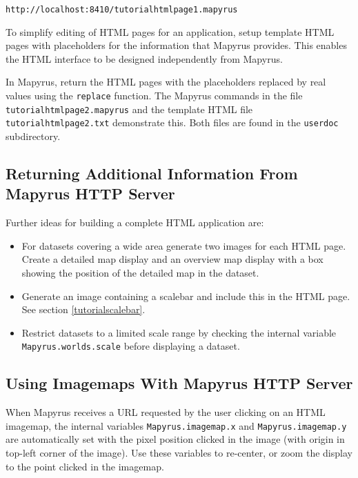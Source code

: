 \begin{verbatim}
http://localhost:8410/tutorialhtmlpage1.mapyrus
\end{verbatim}

To simplify editing of HTML pages for an application, setup
template HTML pages with placeholders for the information that
Mapyrus provides.  This enables the HTML interface to be designed
independently from Mapyrus.

In Mapyrus, return the HTML pages with the placeholders
replaced by real values using the
\texttt{replace}
function.  The Mapyrus commands in the file \texttt{tutorialhtmlpage2.mapyrus}
and the template HTML file \texttt{tutorialhtmlpage2.txt}
demonstrate this.  Both files are found in the
\texttt{userdoc} subdirectory.

\subsection{Returning Additional Information From Mapyrus HTTP Server}

Further ideas for building a complete HTML application are:

\begin{itemize}
\item
For datasets covering a wide area generate two images for
each HTML page.  Create a detailed map display and an overview map display
with a box showing the position of the detailed map in the dataset.

\item
Generate an image containing a scalebar
and include this in the HTML page.  See section \ref{tutorialscalebar}.

\item
Restrict datasets to a limited scale range by checking the
internal variable
\texttt{Mapyrus.worlds.scale} before displaying a dataset.
\end{itemize}

\subsection{Using Imagemaps With Mapyrus HTTP Server}

When Mapyrus receives a URL requested by the user
clicking on an HTML imagemap, the
internal variables
\texttt{Mapyrus.imagemap.x} and
\texttt{Mapyrus.imagemap.y} are automatically set with the pixel position
clicked in the image (with origin in top-left corner of the image).
Use these variables to re-center, or zoom the display to the
point clicked in the imagemap.

